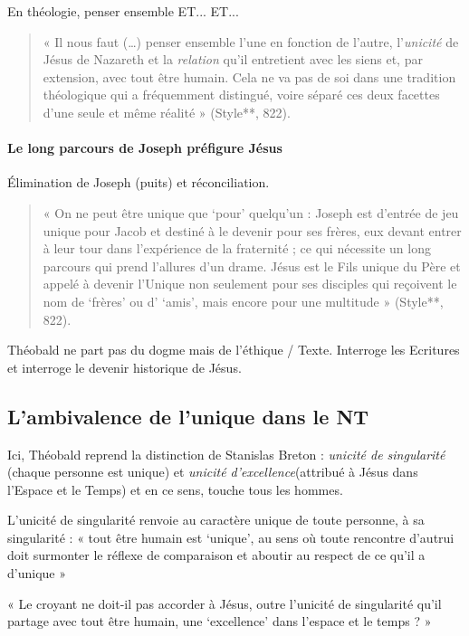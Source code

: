 \begin{Prop}
En théologie, penser ensemble ET... ET...
\end{Prop}


\begin{quote}
    « Il nous faut (…) penser ensemble l’une en fonction de l’autre, l’\textit{unicité} de Jésus de Nazareth et la \textit{relation} qu’il entretient avec les siens et, par extension, avec tout être humain. Cela ne va pas de soi dans une tradition théologique qui a fréquemment distingué, voire séparé ces deux facettes d’une seule et même réalité » (Style**, 822).
\end{quote}


\paragraph{Le long parcours de Joseph préfigure Jésus} Élimination de Joseph (puits) et réconciliation. 
\begin{quote}
    « On ne peut être unique que ‘pour’ quelqu’un : Joseph est d’entrée de jeu unique pour Jacob et destiné à le devenir pour ses frères, eux devant entrer à leur tour dans l’expérience de la fraternité ; ce qui nécessite un long parcours qui prend l’allures d’un drame. Jésus est le Fils unique du Père et appelé à devenir l’Unique non seulement pour ses disciples qui reçoivent le nom de ‘frères’ ou d’ ‘amis’, mais encore pour une multitude » (Style**, 822).
\end{quote}


\begin{Synthesis}
Théobald ne part pas du dogme mais de l'éthique / Texte. Interroge les Ecritures et interroge le devenir historique de Jésus.
\end{Synthesis}


\subsection{L’ambivalence de l’unique dans le NT}

Ici, Théobald reprend la distinction de Stanislas Breton : \textit{unicité de singularité} (chaque personne est unique) et \textit{unicité d'excellence}(attribué à Jésus dans l'Espace et le Temps) et en ce sens, touche tous les hommes.
\begin{Def}
 L’unicité de singularité renvoie au caractère unique de toute
personne, à sa singularité : « tout être humain est ‘unique’, au sens où toute rencontre d’autrui
doit surmonter le réflexe de comparaison et aboutir au respect de ce qu’il a d’unique »
\end{Def}
\begin{Def}
  « Le croyant ne doit-il pas accorder à Jésus, outre l’unicité de
singularité qu’il partage avec tout être humain, une ‘excellence’ dans l’espace et le temps ? »
\end{Def}

